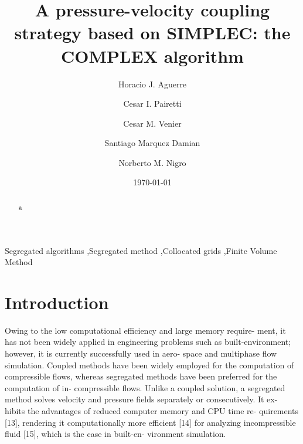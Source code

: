 \documentclass[final,3p,times,11pt,onecolumn]{myElsarticle}
\date{\today}
\numberwithin{equation}{section}
\begin{document}
\begin{frontmatter}

\title{A pressure-velocity coupling strategy based on SIMPLEC: the COMPLEX algorithm}
 
\author[a]{Horacio J. Aguerre}
\author[b,a]{Cesar I. Pairetti}
\author[a,b]{Cesar M. Venier}
\author[a,c]{Santiago Marquez Damian}
\author[a,d]{Norberto M. Nigro}

\address[a]{Centro de Investigación de Métodos Computacionales, CONICET-UNL, Santa Fe, Argentina}
\address[b]{Escuela de Ingenier\'ia Mec\'anica, Facultad de Ciencias Exactas, Ingenieria y Agrimensura, Universidad Nacional de Rosario, Rosario, Argentina}
\address[c]{Facultad Regional Santa Fe, Universidad Tecnologica Nacional, Santa Fe, Argentina}
\address[d]{Facultad de Ingeniería y Ciencias Hídricas, Universidad Nacional del Litoral, Santa Fe, Argentina}

\begin{abstract}
a
\end{abstract}

\begin{keyword}
Segregated algorithms \sep Segregated method \sep Collocated grids \sep Finite Volume Method 
\end{keyword}
\end{frontmatter}

\section{Introduction}

{\color{red}Owing to the low computational efficiency and large memory require-
ment, it has not been widely applied in engineering problems such as
built-environment; however, it is currently successfully used in aero-
space and multiphase flow simulation. Coupled methods have been
widely employed for the computation of compressible flows, whereas
segregated methods have been preferred for the computation of in-
compressible flows. Unlike a coupled solution, a segregated method
solves velocity and pressure fields separately or consecutively. It ex-
hibits the advantages of reduced computer memory and CPU time re-
quirements [13], rendering it computationally more efficient [14] for
analyzing incompressible fluid [15], which is the case in built-en-
vironment simulation.}
\end{document}
